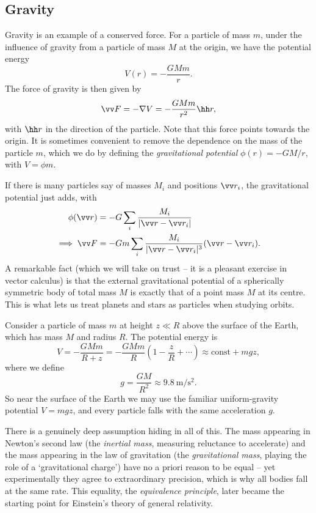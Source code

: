 \subsection{Gravity}

Gravity is an example of a conserved force. For a particle of mass $m$, under the influence of gravity from a particle of mass $M$ at the origin, we have the potential energy
$$
V(r) = -\frac{GMm}{r}.
$$
The force of gravity is then given by
$$
\vv F = - \nabla V = -\frac{G Mm}{r^2} \hh r,
$$
with $\hh r$ in the direction of the particle. Note that this force points towards the origin.
It is sometimes convenient to remove the dependence on the mass of the particle $m$, which we do by defining the \emph{gravitational potential} $\phi(r) = -GM/r$, with $V = \phi m$.

If there is many particles say of masses $M_i$ and positions $\vv r_i$, the gravitational potential just adds, with
\begin{align*}
	\phi(\vv r) &= -G \sum_i \frac{M_i}{|\vv r - \vv r_i|} \\
\implies \vv F &= -Gm \sum_i \frac{M_i}{|\vv r - \vv r_i|^3} (\vv r - \vv r_i).
\end{align*}
A remarkable fact (which we will take on trust -- it is a pleasant exercise in vector calculus) is that the external gravitational potential of a spherically symmetric body of total mass $M$ is exactly that of a point mass $M$ at its centre. This is what lets us treat planets and stars as particles when studying orbits.

\begin{example}
	Consider a particle of mass $m$ at height $z \ll R$ above the surface of the Earth, which has mass $M$ and radius $R$. The potential energy is
	$$
	V = -\frac{GMm}{R + z} = -\frac{GMm}{R}\left(1 - \frac{z}{R} + \cdots\right) \approx \text{const} + mgz,
	$$
	where we define
	$$
	g = \frac{GM}{R^2} \approx \SI{9.8}{\meter\per\second\squared}.
	$$
	So near the surface of the Earth we may use the familiar uniform-gravity potential $V = mgz$, and every particle falls with the same acceleration $g$.
\end{example}

There is a genuinely deep assumption hiding in all of this. The mass appearing in Newton's second law (the \emph{inertial mass}, measuring reluctance to accelerate) and the mass appearing in the law of gravitation (the \emph{gravitational mass}, playing the role of a `gravitational charge') have no a priori reason to be equal -- yet experimentally they agree to extraordinary precision, which is why all bodies fall at the same rate. This equality, the \emph{equivalence principle}, later became the starting point for Einstein's theory of general relativity.

